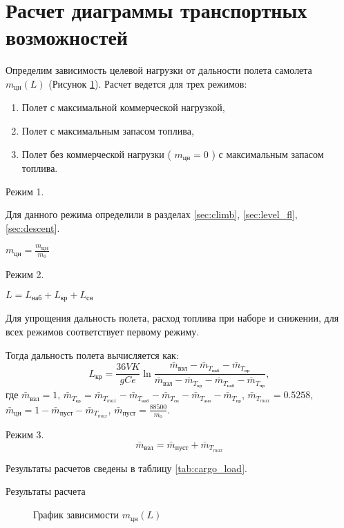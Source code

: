 \section{Расчет диаграммы транспортных возможностей}

Определим зависимость целевой нагрузки от дальности полета самолета $m_{цн}(L)$
(Рисунок \ref{fig:m_L}).
Расчет ведется для трех режимов:
\begin{enumerate}
    \item Полет с максимальной коммерческой нагрузкой,
    \item Полет с максимальным запасом топлива,
    \item Полет без коммерческой нагрузки ( $m_{цн}=0$ ) с максимальным запасом топлива.
\end{enumerate}

Режим 1.

Для данного режима определили в разделах \ref{sec:climb}, \ref{sec:level_fl}, \ref{sec:descent}.

$m_{цн} = \frac{m_{ЦН}}{m_0}$

Режим 2.

$ L = L_{наб} + L_{кр} + L_{сн} $

Для упрощения дальность полета, расход топлива при наборе и снижении,
для всех режимов соответствует первому режиму.

Тогда дальность полета вычисляется как:
\begin{equation}
    L_{кр} = \frac{36 V K}{gCe} \ln{\frac{\bar{m}_{взл} - \bar{m}_{T_{наб}} - \bar{m}_{T_{пр}}}{\bar{m}_{взл}-\bar{m}_{T_{кр}}-\bar{m}_{T_{наб}} - \bar{m}_{T_{пр}}}},
\end{equation}
где $ \bar{m}_{взл} = 1 $, $ \bar{m}_{T_{кр}} = \bar{m}_{T_{max}}- \bar{m}_{T_{наб}} - \bar{m}_{T_{сн}} -
\bar{m}_{T_{анз}} - \bar{m}_{T_{пр}} $, $ \bar{m}_{T_{max}} = 0.5258 $, $
\bar{m}_{цн} = 1 - \bar{m}_{пуст} - \bar{m}_{T_{max}} $, $ \bar{m}_{пуст} =
\frac{88500}{m_0} $.

Режим 3.
\[
    \bar{m}_{взл} = \bar{m}_{пуст} + \bar{m}_{T_{max}}
\]

Результаты расчетов сведены в таблицу \ref{tab:cargo_load}.

\begin{table}[H]
    \centering
    \caption{Результаты расчета}
    \label{tab:cargo_load}
    
\end{table}

\begin{figure}[H]
\centering
\resizebox{.79\linewidth}{!}{}
\caption{График зависимости $m_{цн}(L)$}
\label{fig:m_L}
\end{figure}



